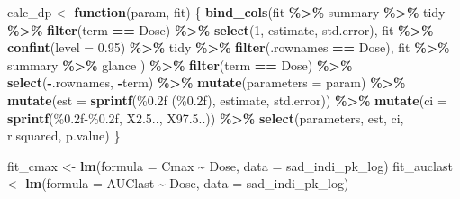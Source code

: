 \documentclass[
  10pt,
]{krantz}
\makeatletter
\newenvironment{Shaded}{\begin{snugshade}}{\end{snugshade}}
\newcommand{\ControlFlowTok}[1]{\textcolor[rgb]{0.13,0.29,0.53}{\textbf{#1}}}
\newcommand{\DataTypeTok}[1]{\textcolor[rgb]{0.13,0.29,0.53}{#1}}
\newcommand{\DecValTok}[1]{\textcolor[rgb]{0.00,0.00,0.81}{#1}}
\newcommand{\FloatTok}[1]{\textcolor[rgb]{0.00,0.00,0.81}{#1}}
\newcommand{\KeywordTok}[1]{\textcolor[rgb]{0.13,0.29,0.53}{\textbf{#1}}}
\newcommand{\NormalTok}[1]{#1}
\newcommand{\OperatorTok}[1]{\textcolor[rgb]{0.81,0.36,0.00}{\textbf{#1}}}
\newcommand{\StringTok}[1]{\textcolor[rgb]{0.31,0.60,0.02}{#1}}
\newenvironment{kframe}{%
\medskip{}
\setlength{\fboxsep}{.8em}
 \def\at@end@of@kframe{}%
 \ifinner\ifhmode%
  \def\at@end@of@kframe{\end{minipage}}%
  \begin{minipage}{\columnwidth}%
 \fi\fi%
 \def\FrameCommand##1{\hskip\@totalleftmargin \hskip-\fboxsep
 \colorbox{shadecolor}{##1}\hskip-\fboxsep
     \hskip-\linewidth \hskip-\@totalleftmargin \hskip\columnwidth}%
 \MakeFramed {\advance\hsize-\width
   \@totalleftmargin\z@ \linewidth\hsize
   \@setminipage}}%
 {\par\unskip\endMakeFramed%
 \at@end@of@kframe}
\renewenvironment{Shaded}{\begin{kframe}}{\end{kframe}}
\makeatother
\begin{document}
\begin{Shaded}
\begin{Highlighting}[]
\NormalTok{calc\_dp \textless{}{-}}\StringTok{ }\ControlFlowTok{function}\NormalTok{(param, fit) \{}
  \KeywordTok{bind\_cols}\NormalTok{(fit }\OperatorTok{\%\textgreater{}\%}\StringTok{ }\NormalTok{summary }\OperatorTok{\%\textgreater{}\%}\StringTok{ }\NormalTok{tidy }\OperatorTok{\%\textgreater{}\%}\StringTok{ }\KeywordTok{filter}\NormalTok{(term }\OperatorTok{==}\StringTok{ \textquotesingle{}Dose\textquotesingle{}}\NormalTok{) }\OperatorTok{\%\textgreater{}\%}\StringTok{ }\KeywordTok{select}\NormalTok{(}\DecValTok{1}\NormalTok{, }\StringTok{\textquotesingle{}estimate\textquotesingle{}}\NormalTok{, }\StringTok{\textquotesingle{}std.error\textquotesingle{}}\NormalTok{), }
\NormalTok{            fit }\OperatorTok{\%\textgreater{}\%}\StringTok{ }\KeywordTok{confint}\NormalTok{(}\DataTypeTok{level =} \FloatTok{0.95}\NormalTok{) }\OperatorTok{\%\textgreater{}\%}\StringTok{ }\NormalTok{tidy }\OperatorTok{\%\textgreater{}\%}\StringTok{ }\KeywordTok{filter}\NormalTok{(.rownames }\OperatorTok{==}\StringTok{ \textquotesingle{}Dose\textquotesingle{}}\NormalTok{), }
\NormalTok{            fit }\OperatorTok{\%\textgreater{}\%}\StringTok{ }\NormalTok{summary }\OperatorTok{\%\textgreater{}\%}\StringTok{ }\NormalTok{glance}
\NormalTok{            ) }\OperatorTok{\%\textgreater{}\%}\StringTok{ }
\StringTok{    }\KeywordTok{filter}\NormalTok{(term }\OperatorTok{==}\StringTok{ \textquotesingle{}Dose\textquotesingle{}}\NormalTok{) }\OperatorTok{\%\textgreater{}\%}\StringTok{ }
\StringTok{    }\KeywordTok{select}\NormalTok{(}\OperatorTok{{-}}\NormalTok{.rownames, }\OperatorTok{{-}}\NormalTok{term) }\OperatorTok{\%\textgreater{}\%}\StringTok{ }
\StringTok{    }\KeywordTok{mutate}\NormalTok{(}\DataTypeTok{parameters =}\NormalTok{ param) }\OperatorTok{\%\textgreater{}\%}\StringTok{ }
\StringTok{    }\KeywordTok{mutate}\NormalTok{(}\DataTypeTok{est =} \KeywordTok{sprintf}\NormalTok{(}\StringTok{\textquotesingle{}\%0.2f (\%0.2f)\textquotesingle{}}\NormalTok{, estimate, std.error)) }\OperatorTok{\%\textgreater{}\%}\StringTok{ }
\StringTok{    }\KeywordTok{mutate}\NormalTok{(}\DataTypeTok{ci =} \KeywordTok{sprintf}\NormalTok{(}\StringTok{\textquotesingle{}\%0.2f{-}\%0.2f\textquotesingle{}}\NormalTok{, X2.}\DecValTok{5}\NormalTok{.., X97.}\DecValTok{5}\NormalTok{..)) }\OperatorTok{\%\textgreater{}\%}\StringTok{ }
\StringTok{    }\KeywordTok{select}\NormalTok{(parameters, est, ci, r.squared, p.value)}
\NormalTok{\}}

\NormalTok{fit\_cmax \textless{}{-}}\StringTok{ }\KeywordTok{lm}\NormalTok{(}\DataTypeTok{formula =}\NormalTok{ Cmax }\OperatorTok{\textasciitilde{}}\StringTok{ }\NormalTok{Dose, }\DataTypeTok{data =}\NormalTok{ sad\_indi\_pk\_log)}
\NormalTok{fit\_auclast \textless{}{-}}\StringTok{ }\KeywordTok{lm}\NormalTok{(}\DataTypeTok{formula =}\NormalTok{ AUClast }\OperatorTok{\textasciitilde{}}\StringTok{ }\NormalTok{Dose, }\DataTypeTok{data =}\NormalTok{ sad\_indi\_pk\_log)}


\end{Highlighting}
\end{Shaded}
\end{document}
